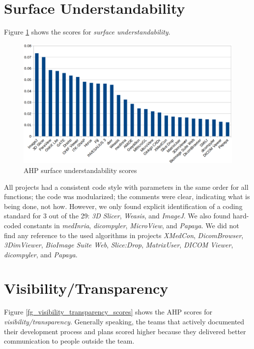 \section{Surface Understandability}
\label{sec_result_understandability}
Figure \ref{fg_surface_understandability_scores} shows the scores for \textit{surface understandability}.

\begin{figure}[H]
\includegraphics[scale=0.38]{figures/understandability_scores.png}
\caption{AHP surface understandability scores}
\label{fg_surface_understandability_scores}
\end{figure}

All projects had a consistent code style with parameters in the same order for all functions; the code was modularized; the comments were clear, indicating what is being done, not how. However, we only found explicit identification of a coding standard for 3 out of the 29: \textit{3D Slicer}, \textit{Weasis}, and \textit{ImageJ}. We also found hard-coded constants in \textit{medInria}, \textit{dicompyler}, \textit{MicroView}, and \textit{Papaya}. We did not find any reference to the used algorithms in projects \textit{XMedCon}, \textit{DicomBrowser}, \textit{3DimViewer}, \textit{BioImage Suite Web}, \textit{Slice:Drop}, \textit{MatrixUser}, \textit{DICOM Viewer}, \textit{dicompyler}, and \textit{Papaya}. 

\section{Visibility/Transparency}
\label{sec_result_visibility_transparency}
Figure \ref{fg_visibility_transparency_scores} shows the AHP scores for \textit{visibility/transparency}. Generally speaking, the teams that actively documented their development process and plans scored higher because they delivered better communication to people outside the team.

